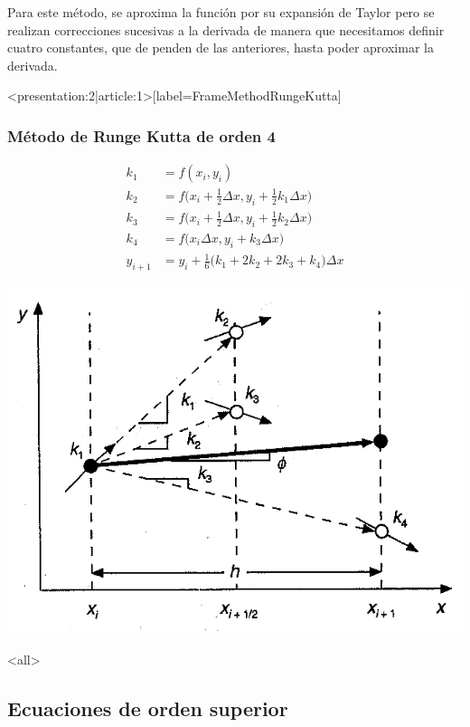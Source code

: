 Para este método, se aproxima la función por su expansión de Taylor pero se
realizan correcciones sucesivas a la derivada de manera que necesitamos definir
cuatro constantes, que de penden de las anteriores, hasta poder aproximar la
derivada. 
\mode*
\begin{frame}<presentation:2|article:1>[label=FrameMethodRungeKutta]
  \frametitle<presentation>{Método de Runge Kutta de orden 4}
  \center
  \begin{minipage}{0.4\textwidth}
    \begin{equation}
      \begin{aligned}
	k_1 &= f(x_i, y_i)\\
	k_2 &= f \Big( x_i + \frac{1}{2} \Delta x, y_i + \frac{1}{2} k_1 \Delta x \Big)\\
	k_3 &= f \Big( x_i + \frac{1}{2} \Delta x, y_i + \frac{1}{2} k_2 \Delta x \Big)\\
	k_4 &= f \Big( x_i \Delta x, y_i + k_3 \Delta x \Big)\\
	y_{i+1} &= y_i+\frac{1}{6} \Big( k_1 + 2 k_2 + 2 k_3 + k_4 \Big) \Delta x
      \end{aligned}
    \end{equation}
  \end{minipage}
  \begin{minipage}{0.4\textwidth}
    \includegraphics[width=\textwidth]{libreoffice/propagacion-RungeKutta.png}
  \end{minipage}
\end{frame}
\mode<all>

\subsection{Ecuaciones de orden superior}

